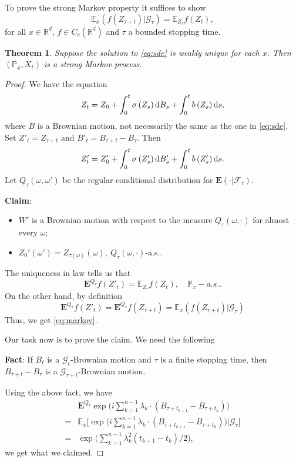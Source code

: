 \documentclass[twoside, 12pt]{book}
\numberwithin{equation}{chapter}
\newtheorem{theorem}{Theorem}[section]
\def\cF{{\mathcal F}}
\def\cG{{\mathcal G}}
\def\mE{{\mathbb E}}
\def\mP{{\mathbb P}}
\def\mR{{\mathbb R}}
\def\bE{{\mathbf E}}
\def\d{\text{\rm{d}}}
\begin{document}
	To prove the strong Markov property it suffices to show 
	\begin{equation}\label{eq:markov}
		\mE_x(f(Z_{\tau+t})|\cG_\tau)=\mE_{Z_\tau} f(Z_t),
	\end{equation}
	for all $x\in \mR^d$, $f\in C_c(\mR^d)$ and $\tau$ a bounded stopping time. 
	
	\begin{theorem}\label{thm:Markov}
		Suppose the solution to \eqref{eq:sde} is weakly unique for each $x$. Then $(\mP_x, X_t)$ is a strong Markov process.
	\end{theorem}
	
	\begin{proof}
		We have the equation 
		$$
		Z_t=Z_0+\int_0^t \sigma\left(Z_s\right) \d B_s+\int_0^t b\left(Z_s\right) \d s,
		$$
		where $B$ is a Brownian motion, not necessarily the same as the one in \eqref{eq:sde}. Set $Z'_t=Z_{\tau+t}$ and $B'_t=B_{\tau+t}-B_{\tau}$. Then 
		\begin{equation}
			Z'_t=Z'_0+\int_0^t \sigma\left(Z'_s\right) \d B'_s+\int_0^t b\left(Z'_s\right) \d s.
		\end{equation}
		Let $Q_\tau(\omega, \omega')$ be the regular conditional distribution for $\bE (\cdot|\cF_\tau)$. 
		\begin{framed}
			{\bf Claim}: \begin{itemize}
				\item $W'$ is a Brownian motion with respect to the measure $Q_{\tau}(\omega, \cdot)$ for almost every $\omega$; 
				\item $Z_0'(\omega')=Z_{\tau(\omega)}(\omega), ~ Q_\tau(\omega,\cdot)$-a.s.. 
			\end{itemize}
		\end{framed}
	    The uniqueness in law tells us that
		$$
		\bE^{Q_{\tau}} f\left(Z'_t\right)=\mathbb{E}_{Z_\tau} f\left(Z_t\right), \quad \mP_x-a.s..
		$$
		On the other hand, by definition 
		$$
		\bE^{Q_{\tau}} f\left(Z'_t\right)= \bE^{Q_{\tau}} f\left(Z_{\tau+t}\right)= \mE_x(f(Z_{\tau+t})|\cG_{\tau})
		$$
		Thus, we get \eqref{eq:markov}. 
		
		Our task now is to prove the claim. We need the following 
		\begin{framed}
			{\bf Fact}: If $B_t$ is a $\cG_t$-Brownian motion and $\tau$ is a finite stopping time, then $B_{\tau+t}-B_{\tau}$ is a $\cG_{\tau+t}$-Brownian motion. 
		\end{framed}
		Using the above fact, we have 
		\begin{equation*}
			\begin{aligned}
				&\bE^{Q_\tau} \exp \Big(i \sum_{k=1}^{n-1} \lambda_{k} \cdot\left(B_{\tau+t_{k+1}}-B_{\tau+t_{k}}\right)\Big)\\
				=&\mE_{x} \Big[ \exp \Big(i \sum_{k=1}^{n-1} \lambda_{k} \cdot\left(B_{\tau+t_{k+1}}-B_{\tau+t_{k}}\right)\Big)\Big|\cG_\tau\Big]\\
				=& \exp \Big(\sum_{k=1}^{n-1}  \lambda_k^2\left(t_{k+1}-t_{k}\right) / 2\Big), 
			\end{aligned}
		\end{equation*}
		we get what we claimed.
	\end{proof}
	
\end{document}
